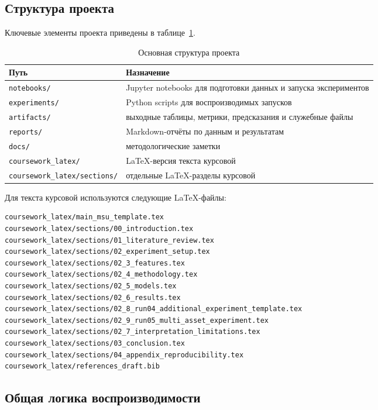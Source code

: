 \subsection*{Структура проекта}

Ключевые элементы проекта приведены в таблице~\ref{tab:appendix_project_structure}.

\begin{table}[htbp]
\centering
\begin{tabular}{ll}
\toprule
Путь & Назначение \\
\midrule
\texttt{notebooks/} & Jupyter notebooks для подготовки данных и запуска экспериментов \\
\texttt{experiments/} & Python scripts для воспроизводимых запусков \\
\texttt{artifacts/} & выходные таблицы, метрики, предсказания и служебные файлы \\
\texttt{reports/} & Markdown-отчёты по данным и результатам \\
\texttt{docs/} & методологические заметки \\
\texttt{coursework\_latex/} & LaTeX-версия текста курсовой \\
\texttt{coursework\_latex/sections/} & отдельные LaTeX-разделы курсовой \\
\bottomrule
\end{tabular}
\caption{Основная структура проекта}
\label{tab:appendix_project_structure}
\end{table}

Для текста курсовой используются следующие LaTeX-файлы:

\begin{Verbatim}[fontsize=\small]
coursework_latex/main_msu_template.tex
coursework_latex/sections/00_introduction.tex
coursework_latex/sections/01_literature_review.tex
coursework_latex/sections/02_experiment_setup.tex
coursework_latex/sections/02_3_features.tex
coursework_latex/sections/02_4_methodology.tex
coursework_latex/sections/02_5_models.tex
coursework_latex/sections/02_6_results.tex
coursework_latex/sections/02_8_run04_additional_experiment_template.tex
coursework_latex/sections/02_9_run05_multi_asset_experiment.tex
coursework_latex/sections/02_7_interpretation_limitations.tex
coursework_latex/sections/03_conclusion.tex
coursework_latex/sections/04_appendix_reproducibility.tex
coursework_latex/references_draft.bib
\end{Verbatim}

\subsection*{Общая логика воспроизводимости}


